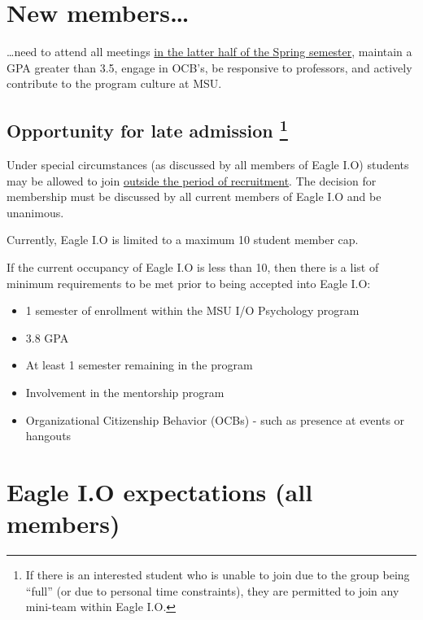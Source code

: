 \documentclass[
]{book}
\providecommand{\tightlist}{%
  \setlength{\itemsep}{0pt}\setlength{\parskip}{0pt}}
\begin{document}
\hypertarget{new-members}{%
\section{New members\ldots{}}\label{new-members}}

\ldots need to attend all meetings \protect\hyperlink{timetable}{in the latter half of the Spring semester}, maintain a GPA greater than 3.5, engage in OCB's, be responsive to professors, and actively contribute to the program culture at MSU.

\hypertarget{late}{%
\subsection[Opportunity for late admission ]{\texorpdfstring{Opportunity for late admission \footnote{If there is an interested student who is unable to join due to the group being ``full'' (or due to personal time constraints), they are permitted to join any mini-team within Eagle I.O.}}{Opportunity for late admission }}\label{late}}

Under special circumstances (as discussed by all members of Eagle I.O) students may be allowed to join \protect\hyperlink{late}{outside the period of recruitment}. The decision for membership must be discussed by all current members of Eagle I.O and be unanimous.

Currently, Eagle I.O is limited to a maximum 10 student member cap.

If the current occupancy of Eagle I.O is less than 10, then there is a list of minimum requirements to be met prior to being accepted into Eagle I.O:

\begin{itemize}
\tightlist
\item
  1 semester of enrollment within the MSU I/O Psychology program
\item
  3.8 GPA
\item
  At least 1 semester remaining in the program
\item
  Involvement in the mentorship program
\item
  Organizational Citizenship Behavior (OCBs) - such as presence at events or hangouts
\end{itemize}

\hypertarget{eagle-i.o-expectations-all-members}{%
\section{Eagle I.O expectations (all members)}\label{eagle-i.o-expectations-all-members}}
\end{document}
